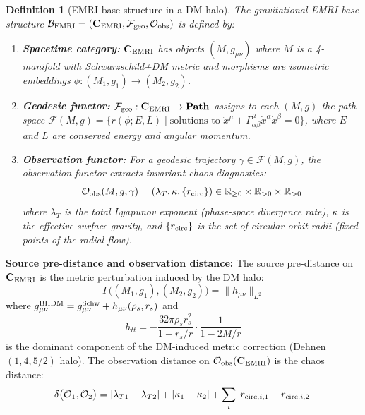\documentclass[
]{article}
\newtheorem{definition}[theorem]{Definition}
\begin{document}
\begin{definition}[EMRI base structure in a DM halo]\label{def:base-emri}
The gravitational EMRI base structure $\mathcal{B}_{\rm EMRI} = (\mathbf{C}_{\rm EMRI}, \mathcal{F}_{\rm geo}, \mathcal{O}_{\rm obs})$ is defined by:
\begin{enumerate}
\item \textbf{Spacetime category:} $\mathbf{C}_{\rm EMRI}$ has objects $(M, g_{\mu\nu})$ where $M$ is a 4-manifold with Schwarzschild+DM metric and morphisms are isometric embeddings $\phi: (M_1, g_1) \to (M_2, g_2)$.

\item \textbf{Geodesic functor:} $\mathcal{F}_{\rm geo}: \mathbf{C}_{\rm EMRI} \to \mathbf{Path}$ assigns to each $(M, g)$ the path space $\mathcal{F}(M, g) = \{r(\phi; E, L) \mid \text{solutions to } \ddot{x}^\mu + \Gamma^\mu_{\alpha\beta}\dot{x}^\alpha\dot{x}^\beta = 0\}$, where $E$ and $L$ are conserved energy and angular momentum.

\item \textbf{Observation functor:} For a geodesic trajectory $\gamma \in \mathcal{F}(M, g)$, the observation functor extracts invariant chaos diagnostics:
\begin{equation}
\mathcal{O}_{\rm obs}(M, g, \gamma) = (\lambda_T, \kappa, \{r_{\rm circ}\}) \in \mathbb{R}_{\geq 0} \times \mathbb{R}_{>0} \times \mathbb{R}_{>0}
\end{equation}
where $\lambda_T$ is the total Lyapunov exponent (phase-space divergence rate), $\kappa$ is the effective surface gravity, and $\{r_{\rm circ}\}$ is the set of circular orbit radii (fixed points of the radial flow).
\end{enumerate}
\end{definition}

\textbf{Source pre-distance and observation distance:} The source pre-distance on $\mathbf{C}_{\rm EMRI}$ is the metric perturbation induced by the DM halo:
\begin{equation}
\Gamma\bigl((M_1, g_1), (M_2, g_2)\bigr) = \|h_{\mu\nu}\|_{L^2}
\end{equation}
where $g_{\mu\nu}^{\rm BHDM} = g_{\mu\nu}^{\rm Schw} + h_{\mu\nu}(\rho_s, r_s)$ and
\begin{equation}
h_{tt} = -\frac{32\pi\rho_s r_s^2}{1 + r_s/r} \cdot \frac{1}{1 - 2M/r}
\end{equation}
is the dominant component of the DM-induced metric correction (Dehnen $(1, 4, 5/2)$ halo). The observation distance on $\mathcal{O}_{\rm obs}(\mathbf{C}_{\rm EMRI})$ is the chaos distance:
\begin{equation}
\delta\bigl(\mathcal{O}_1, \mathcal{O}_2\bigr) = |\lambda_{T1} - \lambda_{T2}| + |\kappa_1 - \kappa_2| + \sum_i |r_{{\rm circ}, i, 1} - r_{{\rm circ}, i, 2}|
\end{equation}
\end{document}
